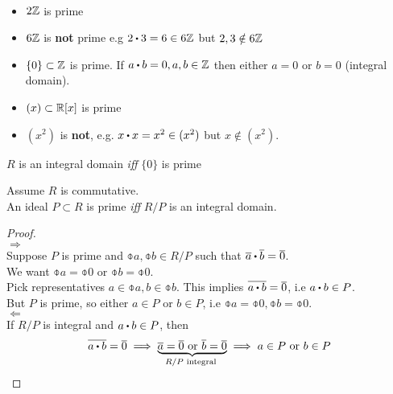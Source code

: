 \documentclass[../Main.tex]{subfiles}
\begin{document}
\newpage
\begin{example}~
\begin{itemize}
	\item$2\mathbb{Z}$ is prime
	\item$6\mathbb{Z}$ is \textbf{not} prime e.g $2\rdot 3 = 6 \in 6\Z$ but $2,3\notin 6\mathbb{Z}$
	\item $\{0\} \subset \mathbb{Z}$ is prime. If $a\rdot b=0, a,b \in \Z$ then either $a=0$ or $b=0$ (integral domain).
	\item $(x)\subset \mathbb{R}[x]$ is prime
	\item $(x^2)$ is \textbf{not}, e.g. $x\rdot x=x^2\in (x^2)$ but $x\notin (x^2)$.
\end{itemize}
\end{example}
\begin{prop}
	$R$ is an integral domain \textit{iff} $\{0\}$ is prime
\end{prop}
\begin{thm}[title = Prime Ideal $\Longleftrightarrow R/P$ integral domain]
	Assume $R$ is commutative.\\
	An ideal $P\subset R$ is prime \textit{iff} $R/P$ is an integral domain.
\end{thm}
\begin{proof}~\\
	$\Rightarrow$\\
	Suppose $P$ is prime and  $\obar{a},\obar{b}\in R/P$ such that $\obar{a}\rdot \obar{b}=\obar{0}$.\\
	We want $\obar{a}=\obar{0}$ or $\obar{b}=\obar{0}$.\\
	Pick representatives $a\in \obar{a}, b\in \obar{b}$. This implies $\obar{a\rdot  b} = \obar{0}$, i.e $a\rdot b \in P$.\\
	But $P$ is prime, so either $a\in P$ or $b \in P$, i.e $\obar{a}=\obar{0},\obar{b}=\obar{0}$.\\
	$\Leftarrow$\\
	If $R/P$ is integral and $a\rdot b\in P$, then
	\[\obar{a\rdot b}=\obar{0}\implies \underbrace{\obar{a}=\obar{0} \text{ or } \obar{b} = \obar{0}}_{R/P \text{ integral }} \implies a\in P \text{ or } b \in P\]
\end{proof}
\end{document}
